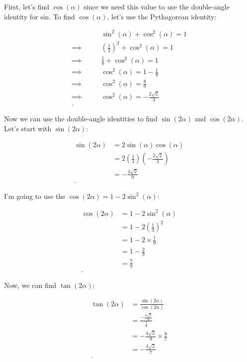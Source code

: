 \begin{solution}
  \label{sol:sin_alpha_1_over_3_in_quadrant_2}

  First, let's find $\cos (\alpha)$ since we need this value to use the
  double-angle identity for sin. To find $\cos (\alpha)$, let's use the
  Pythagorean identity:

  \begin{align*}
    \qquad&\sin^{2} (\alpha) + \cos^{2} (\alpha) = 1 \\
    \implies\qquad&\left(\frac{1}{3}\right)^{2} + \cos^{2} (\alpha) = 1 \\
    \implies\qquad&\frac{1}{9} + \cos^{2} (\alpha) = 1 \\
    \implies\qquad&\cos^{2} (\alpha) = 1 - \frac{1}{9} \\
    \implies\qquad&\cos^{2} (\alpha) = \frac{8}{9} \\
    \implies\qquad&\cos^{2} (\alpha) = -\frac{2\sqrt{2}}{3} \\
  .\end{align*}

  Now we can use the double-angle identities to find $\sin (2\alpha)$ and $\cos
  (2\alpha)$. Let's start with $\sin (2\alpha)$:

  \begin{align*}
    \sin (2\alpha) &= 2\sin (\alpha)\cos (\alpha) \\
                   &= 2\left(\frac{1}{3}\right)\left(-\frac{2\sqrt{2}}{3}\right) \\
                   &= -\frac{4\sqrt{2}}{9} \\
  .\end{align*}

  I'm going to use the $\cos (2\alpha) = 1 - 2\sin^{2} (\alpha)$:

  \begin{align*}
    \cos (2\alpha) &= 1 - 2\sin^{2} (\alpha) \\
                   &= 1 - 2\left(\frac{1}{3}\right)^{2} \\
                   &= 1 - 2 \times \frac{1}{9} \\
                   &= 1 - \frac{2}{9} \\
                   &= \frac{7}{9} \\
  .\end{align*}

  Now, we can find $\tan (2\alpha)$:

  \begin{align*}
    \tan (2\alpha) &= \frac{\sin (2\alpha)}{\cos (2\alpha)} \\
                   &= \frac{-\frac{4\sqrt{2}}{9}}{\frac{7}{9}} \\
                   &= -\frac{4\sqrt{2}}{9} \times \frac{9}{7} \\
                   &= -\frac{4\sqrt{2}}{7} \\
  .\end{align*}
\end{solution}

\begin{solution}
  \label{sol:multiply_vectors_by_scalers}
\end{solution}
